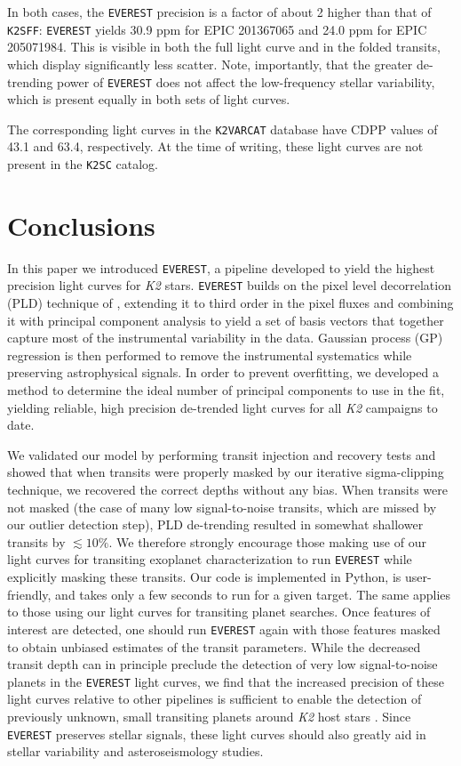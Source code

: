 \documentclass[]{emulateapj}
\begin{document}
In both cases, the \texttt{EVEREST} precision is a factor of about 2 higher than that of
\texttt{K2SFF}: \texttt{EVEREST} yields 30.9 ppm for EPIC 201367065 and 24.0 ppm for EPIC 205071984. 
This is visible 
in both the full light curve and in the folded transits,
which display significantly less scatter. Note, importantly, that the greater de-trending
power of \texttt{EVEREST} does not affect the low-frequency stellar variability, which is 
present equally in both sets of light curves.

The corresponding light curves in the \texttt{K2VARCAT} database have CDPP values of 43.1
and 63.4, respectively. At the time of writing, these light curves are not present in the
\texttt{K2SC} catalog.

\section{Conclusions}
\label{sec:conclusions}
In this paper we introduced \texttt{EVEREST}, a pipeline developed to yield the highest
precision light curves for \emph{K2} stars. \texttt{EVEREST} builds on the pixel level
decorrelation (PLD) technique of \cite{DEM15}, extending it to third order in the pixel
fluxes and combining it with principal component analysis to yield a set of basis
vectors that together capture most of the instrumental variability in the data. Gaussian
process (GP) regression is then performed to remove the instrumental
systematics while preserving astrophysical signals. 
In order to prevent overfitting, we
developed a method to determine the ideal number of principal components to use in the fit, yielding reliable,
high precision de-trended light curves for all \emph{K2} campaigns to date.

We validated our model by performing transit injection and recovery tests and showed that
when transits were properly masked by our iterative sigma-clipping technique, we recovered the correct depths
without any bias.
When transits were not masked (the case of many low signal-to-noise transits, which
are missed by our outlier detection step), PLD de-trending
resulted in somewhat shallower transits by $\lesssim 10\%$. 
We therefore strongly encourage those making use of our light curves for transiting exoplanet
characterization to run \texttt{EVEREST} while explicitly masking these transits. Our code
is implemented in Python, is user-friendly, and takes only a few seconds to run for a given
target. The same applies to those using our light
curves for transiting planet searches. Once features of interest are detected, one
should run \texttt{EVEREST} again with those features masked to obtain unbiased
estimates of the transit parameters.
While the decreased transit depth can in principle preclude the detection of very low signal-to-noise
planets in the \texttt{EVEREST} light curves, we find that the increased precision of these light curves
relative to other pipelines is sufficient to enable the 
detection of previously unknown, small transiting planets around \emph{K2} host stars \citep{KRU16}.
Since \texttt{EVEREST} preserves stellar signals,
these light curves should also greatly aid in stellar variability and asteroseismology studies.
\end{document}
